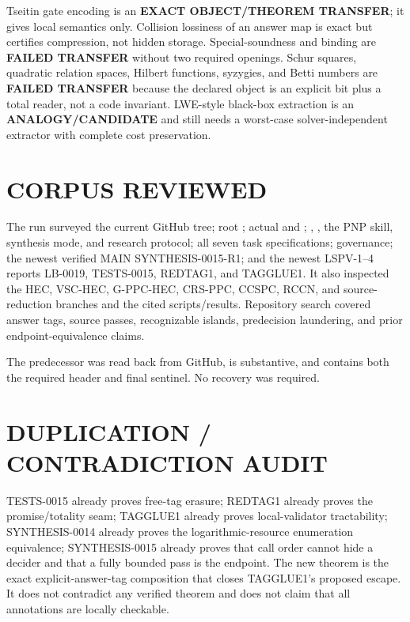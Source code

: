 \documentclass[11pt]{article}
\begin{document}
Tseitin gate encoding is an \textbf{EXACT OBJECT/THEOREM TRANSFER}; it gives
local semantics only.  Collision lossiness of an answer map is exact but
certifies compression, not hidden storage.  Special-soundness and binding are
\textbf{FAILED TRANSFER} without two required openings.  Schur squares,
quadratic relation spaces, Hilbert functions, syzygies, and Betti numbers are
\textbf{FAILED TRANSFER} because the declared object is an explicit bit plus
a total reader, not a code invariant.  LWE-style black-box extraction is an
\textbf{ANALOGY/CANDIDATE} and still needs a worst-case solver-independent
extractor with complete cost preservation.

\section{CORPUS REVIEWED}

The run surveyed the current GitHub tree; root ; actual
 and ; , , the
PNP skill, synthesis mode, and research protocol; all seven task
specifications; governance; the newest verified MAIN SYNTHESIS-0015-R1; and
the newest LSPV-1--4 reports LB-0019, TESTS-0015, REDTAG1, and TAGGLUE1.  It
also inspected the HEC, VSC-HEC, G-PPC-HEC, CRS-PPC, CCSPC, RCCN, and
source-reduction branches and the cited scripts/results.  Repository search
covered answer tags, source passes, recognizable islands, predecision
laundering, and prior endpoint-equivalence claims.

The predecessor
was read back from GitHub, is substantive, and contains both the required
header and final sentinel.  No recovery was required.

\section{DUPLICATION / CONTRADICTION AUDIT}

TESTS-0015 already proves free-tag erasure; REDTAG1 already proves the
promise/totality seam; TAGGLUE1 already proves local-validator tractability;
SYNTHESIS-0014 already proves the logarithmic-resource enumeration
equivalence; SYNTHESIS-0015 already proves that call order cannot hide a
decider and that a fully bounded pass is the endpoint.  The new theorem is
the exact explicit-answer-tag composition that closes TAGGLUE1's proposed
escape.  It does not contradict any verified theorem and does not claim that
all annotations are locally checkable.
\end{document}

